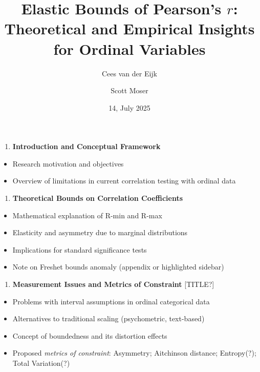 \documentclass[
  12pt,
]{article}
\title{Elastic Bounds of Pearson's \(r\): Theoretical and Empirical
Insights for Ordinal Variables}
\author{Cees van der Eijk \and Scott Moser}
\date{14, July 2025}
\providecommand{\tightlist}{%
  \setlength{\itemsep}{0pt}\setlength{\parskip}{0pt}}\usepackage{longtable,booktabs,array}
\theoremstyle{plain}
\theoremstyle{definition}
\renewcommand*\contentsname{Table of contents}
\newcommand\contentsname{Table of contents}
\theoremstyle{remark}
\begin{document}
\maketitle

\renewcommand*\contentsname{Table of contents}
{
\hypersetup{linkcolor=}
\setcounter{tocdepth}{3}
\tableofcontents
}

\begin{enumerate}
\def\labelenumi{\arabic{enumi}.}
\tightlist
\item
  \textbf{Introduction and Conceptual Framework}
\end{enumerate}

\begin{itemize}
\tightlist
\item
  Research motivation and objectives
\item
  Overview of limitations in current correlation testing with ordinal
  data
\end{itemize}

\begin{enumerate}
\def\labelenumi{\arabic{enumi}.}
\setcounter{enumi}{1}
\tightlist
\item
  \textbf{Theoretical Bounds on Correlation Coefficients}
\end{enumerate}

\begin{itemize}
\tightlist
\item
  Mathematical explanation of R-min and R-max
\item
  Elasticity and asymmetry due to marginal distributions
\item
  Implications for standard significance tests
\item
  Note on Freshet bounds anomaly (appendix or highlighted sidebar)
\end{itemize}

\begin{enumerate}
\def\labelenumi{\arabic{enumi}.}
\setcounter{enumi}{2}
\tightlist
\item
  \textbf{Measurement Issues and Metrics of Constraint} {[}TITLE?{]}
\end{enumerate}

\begin{itemize}
\tightlist
\item
  Problems with interval assumptions in ordinal categorical data
\item
  Alternatives to traditional scaling (psychometric, text-based)
\item
  Concept of boundedness and its distortion effects
\item
  Proposed \emph{metrics of constraint}: Asymmetry; Aitchinson distance;
  Entropy(?); Total Variation(?)
\end{itemize}
\end{document}
